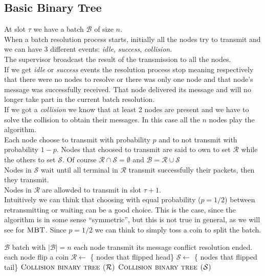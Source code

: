 \documentclass[12pt,a4paper]{report}
\newcommand{\algname}[1]{\ensuremath{\mbox{\sc #1}}}
\begin{document}
\subsection{Basic Binary Tree}
\label{basicbinarytreedescription}
At slot $\tau$ we have a batch $\mathcal{B}$ of size $n$.\\
When a batch resolution process starts, initially all the nodes try to transmit and we can have 3 different events: \emph{idle}, \emph{success}, \emph{collision}.	\\
The supervisor broadcast the result of the transmission to all the nodes.\\
If we get \emph{idle} or  \emph{success} events the resolution process stop meaning respectively that there were no nodes to resolve or there was only one node and that node's message was successfully received. That node delivered its message and will no longer take part in the current batch resolution.\\
If we got a \emph{collision} we know that at least 2 nodes are present and we have to solve the collision to obtain their messages. In this case all the $n$ nodes play the algorithm.\\
Each node choose to transmit with probability $p$ and to not transmit with probability $1-p$. Nodes that choosed to transmit  are said to own to set $\mathcal{R}$ while the others to set $\mathcal{S}$. Of course $\mathcal{R}  \cap \mathcal{S} = \emptyset$ and $\mathcal{B} = \mathcal{R}  \cup \mathcal{S}$\\
Nodes in $\mathcal{S}$ wait until all terminal in $\mathcal{R}$ transmit successfully their packets, then they transmit.\\
Nodes in $\mathcal{R}$ are allowded to transmit in slot $\tau +1$.\\


Intuitively we can think that choosing with equal probability ($p=1/2$) between retransmitting or waiting can be a good choice. This is the case, since the algorithm is in some sense ``symmetric'', but this is not true in general, as we will see for \algname{MBT}. Since $p=1/2$ we can think to simply toss a coin to split the batch.\\


\begin{algorithm}[h!]
\caption{\algname{Collision binary tree ($\mathcal{B}$)}}
\label{alg:binarytree}
\begin{algorithmic}
\STATE {}
\REQUIRE $\mathcal{B}$ batch with $|\mathcal{B}|=n$
\STATE each node transmit its message
	\STATE conflict resolution ended.
\ELSE
	\STATE each node flip a coin
	\STATE $\mathcal{R} \gets$ \{ nodes that flipped head\}
	\STATE $\mathcal{S} \gets$ \{ nodes that flipped tail\}
	\STATE \algname{Collision binary tree ($\mathcal{R}$)}
	\STATE \algname{Collision binary tree ($\mathcal{S}$)}
\ENDIF
\end{algorithmic}
\end{algorithm}
\end{document}
